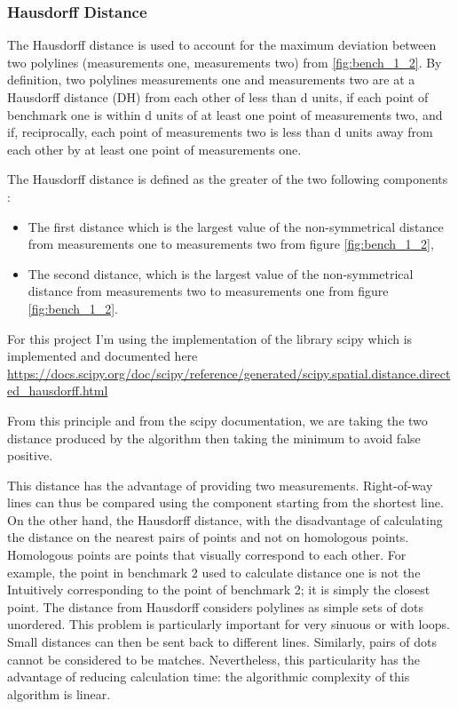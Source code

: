 \documentclass[12pt,a4paper]{article}
\begin{document}
\subsubsection{Hausdorff Distance }
The Hausdorff distance \citep{belogay1997calculating} is used to account for the maximum deviation between two polylines (measurements one, measurements two) from \ref{fig:bench_1_2}. By definition, two polylines measurements one and measurements two are at a Hausdorff distance (DH) from each other of less than d units, if each point of benchmark one is within d units of at least one point of measurements two, and if, reciprocally, each point of measurements two is less than d units away from each other by at least one point of measurements one.

The Hausdorff distance is defined as the greater of the two following components :

\begin{itemize}
    \item The first distance which is the largest value of the non-symmetrical distance from measurements one to measurements two from figure \ref{fig:bench_1_2},
    \item The second distance, which is the largest value of the non-symmetrical distance from measurements two to measurements one from figure \ref{fig:bench_1_2}.
\end{itemize}


For this project I'm using the implementation of the library scipy which is implemented and documented here \url{https://docs.scipy.org/doc/scipy/reference/generated/scipy.spatial.distance.directed_hausdorff.html}

From this principle and from the scipy documentation, we are taking the two distance produced by the algorithm then taking the minimum to avoid false positive.

This distance has the advantage of providing two measurements. Right-of-way lines can thus be compared using the component starting from the shortest line. On the other hand, the Hausdorff distance, with the disadvantage of calculating the
distance on the nearest pairs of points and not on homologous points. Homologous points are points that visually correspond to each other. For example, the point in benchmark 2 used to calculate distance one is not the Intuitively corresponding to the point of benchmark 2; it is simply the closest point. The distance from Hausdorff considers polylines as simple sets of dots unordered. This problem is particularly important for very sinuous or with loops. Small distances can then be sent back to different lines. Similarly, pairs of dots cannot be considered to be matches. Nevertheless, this particularity has the advantage of reducing calculation time: the algorithmic complexity of this algorithm is linear. 
\end{document}
